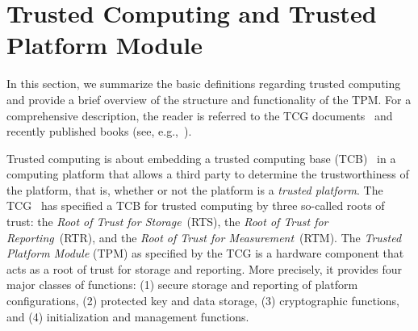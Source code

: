 \documentclass[runningheads]{llncs}
\begin{document}


\section{Trusted Computing and Trusted Platform Module}\label{sec:background}
In this section, we summarize the basic definitions regarding trusted
computing and provide a brief overview of the structure and functionality of
the TPM. For a comprehensive description, the reader is referred to the TCG
documents~\cite{TCGArch,TPM} and recently published books (see, 
e.g.,~\cite{Mitchell2005}).

Trusted computing is about embedding a trusted computing base
(TCB)~\cite{Bishop2003} in a computing platform that allows a third party
to determine the trustworthiness of the platform, that is, whether or not
the platform is a \emph{trusted platform}.
The TCG~\cite{TCGArch} has specified a TCB for trusted computing by three
so-called roots of trust: the \emph{Root of Trust for Storage}~(RTS), the
\emph{Root of Trust for Reporting}~(RTR), and the \emph{Root of Trust for
Measurement}~(RTM). The \emph{Trusted Platform Module} (TPM) as specified
by the TCG is a hardware component that acts as a root of trust for storage
and reporting. More precisely, it provides four major classes of functions:
(1) secure storage and reporting of platform configurations, (2) protected
key and data storage, (3) cryptographic functions, and (4) initialization
and management functions.
\end{document}
